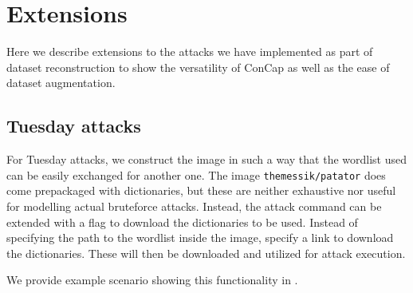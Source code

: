 \section{Extensions}

Here we describe extensions to the attacks we have implemented as part of dataset reconstruction to show the versatility of ConCap as well as the ease of dataset augmentation. 

\subsection{Tuesday attacks}
For Tuesday attacks, we construct the image in such a way that the wordlist used can be easily exchanged for another one. The image \texttt{themessik/patator} does come prepackaged with dictionaries, but these are neither exhaustive nor useful for modelling actual bruteforce attacks. Instead, the attack command can be extended with a flag to download the dictionaries to be used. Instead of specifying the path to the wordlist inside the image, specify a link to download the dictionaries. These will then be downloaded and utilized for attack execution. 

We provide example scenario showing this functionality in .